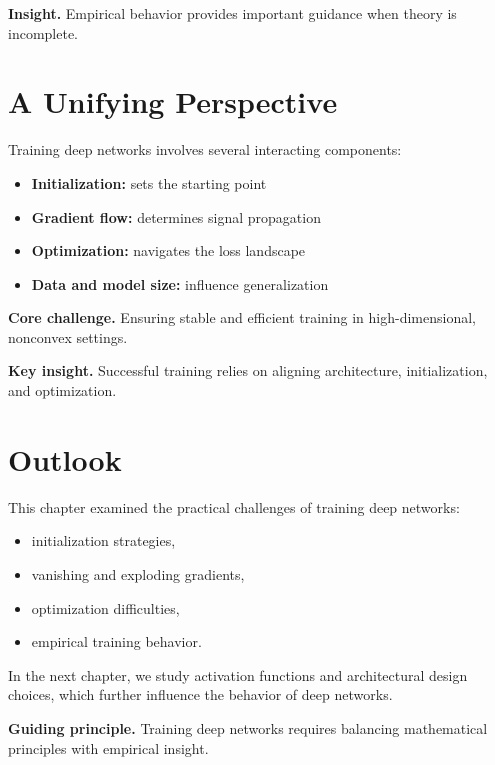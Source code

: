 \medskip

\noindent
\textbf{Insight.}  
Empirical behavior provides important guidance when theory is incomplete.

\section{A Unifying Perspective}

Training deep networks involves several interacting components:

\begin{itemize}
    \item \textbf{Initialization:} sets the starting point
    \item \textbf{Gradient flow:} determines signal propagation
    \item \textbf{Optimization:} navigates the loss landscape
    \item \textbf{Data and model size:} influence generalization
\end{itemize}

\medskip

\noindent
\textbf{Core challenge.}  
Ensuring stable and efficient training in high-dimensional, nonconvex settings.

\medskip

\noindent
\textbf{Key insight.}  
Successful training relies on aligning architecture, initialization, and optimization.

\section{Outlook}

This chapter examined the practical challenges of training deep networks:
\begin{itemize}
    \item initialization strategies,
    \item vanishing and exploding gradients,
    \item optimization difficulties,
    \item empirical training behavior.
\end{itemize}

\medskip

In the next chapter, we study activation functions and architectural design choices, which further influence the behavior of deep networks.

\medskip

\noindent
\textbf{Guiding principle.}  
Training deep networks requires balancing mathematical principles with empirical insight.
